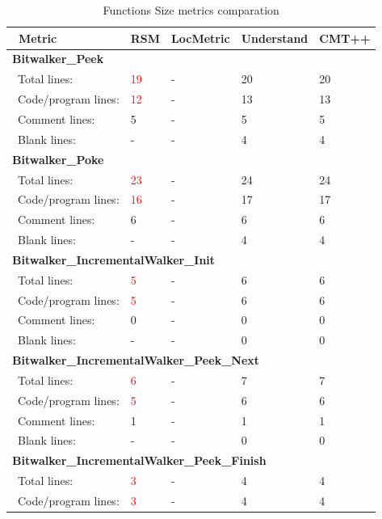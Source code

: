 \begin{longtable}{||p{}|p{}|p{}|p{}|p{}||}
  \caption{Functions Size metrics comparation}\\
    \hline\hline
    \endhead
    \hline\hline
    \endfoot
\ \textbf{Metric} & \textbf{RSM} & \textbf{LocMetric} & \textbf{Understand} & \textbf{CMT++}
\\\hline
\multicolumn{5}{||l||}{\textbf{Bitwalker\_Peek}}
\\\hline
\ Total lines: & \textcolor{red}{19} & - & 20 & 20
\\\hline
\ Code/program lines: & \textcolor{red}{12} & - & 13 & 13
\\\hline
\ Comment lines: & 5 & - & 5 & 5 
\\\hline
\ Blank lines: & - & - & 4 & 4
 \\\hline
 \multicolumn{5}{||l||}{\textbf{Bitwalker\_Poke}}
\\\hline
\ Total lines: & \textcolor{red}{23} & - & 24 & 24
\\\hline
\ Code/program lines: & \textcolor{red}{16} & - & 17 & 17
\\\hline
\ Comment lines: & 6 & - & 6 & 6 
\\\hline
\ Blank lines: & - & - & 4 & 4
 \\\hline
 \multicolumn{5}{||l||}{\textbf{Bitwalker\_IncrementalWalker\_Init}}
\\\hline
\ Total lines: & \textcolor{red}{5} & - & 6 & 6
\\\hline
\ Code/program lines: & \textcolor{red}{5} & - & 6 & 6
\\\hline
\ Comment lines: & 0 & - & 0 & 0 
\\\hline
\ Blank lines: & - & - & 0 & 0
 \\\hline
 \multicolumn{5}{||l||}{\textbf{Bitwalker\_IncrementalWalker\_Peek\_Next}}
\\\hline
\ Total lines: & \textcolor{red}{6} & - & 7 & 7
\\\hline
\ Code/program lines: & \textcolor{red}{5} & - & 6 & 6
\\\hline
\ Comment lines: & 1 & - & 1 & 1 
\\\hline
\ Blank lines: & - & - & 0 & 0
 \\\hline
 \multicolumn{5}{||l||}{\textbf{Bitwalker\_IncrementalWalker\_Peek\_Finish}}
\\\hline
\ Total lines: & \textcolor{red}{3} & - & 4 & 4
\\\hline
\ Code/program lines: & \textcolor{red}{3} & - & 4 & 4

\end{longtable}
